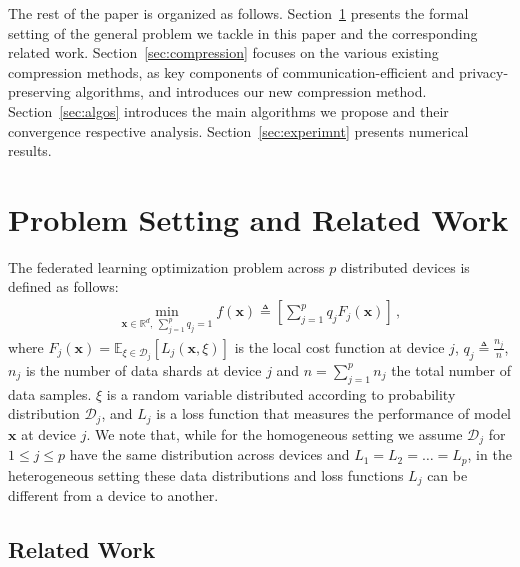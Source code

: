 \documentclass[twoside]{article}
\newcommand{\todo}[1]{\textcolor{red}{ToDo:~#1}}
\begin{document}
The rest of the paper is organized as follows.
Section~\ref{sec:related} presents the formal setting of the general problem we tackle in this paper and the corresponding related work.
Section~\ref{sec:compression} focuses on the various existing compression methods, as key components of communication-efficient and privacy-preserving  algorithms, and introduces our new compression method.
Section~\ref{sec:algos} introduces the main algorithms we propose and their convergence respective analysis.
Section~\ref{sec:experimnt} presents numerical results.

\vspace{-0.05in}
\section{Problem Setting and Related Work}\label{sec:related}
\vspace{-0.05in}


The federated learning optimization problem across $p$ distributed devices is defined as follows:
\begin{align}\label{eq:main}
   \min_{\boldsymbol{x}\in \mathbb{R}^{d},\: \sum_{j=1}^pq_j=1} f(\boldsymbol{x})\triangleq \left[\sum_{j=1}^{p}q_jF_j(\boldsymbol{x})\right] \, , 
\end{align}
where $F_j(\boldsymbol{x})=\mathbb{E}_{\xi\in\mathcal{D}_j}\left[L_j\left(\boldsymbol{x},\xi\right)\right]$ is the local cost function at device $j$, $q_j\triangleq\frac{n_j}{n}$, $n_j$ is the number of data shards at device $j$ and $n=\sum_{j=1}^pn_j$ the total number of data samples.
$\xi$ is a random variable distributed according to probability distribution $\mathcal{D}_j$, and $L_j$ is a loss function that measures the performance of model $\boldsymbol{x}$ at device $j$. 
We note that, while for the homogeneous setting we assume $\mathcal{D}_j$ for $1\leq j\leq p$ have the same distribution across devices and $L_1=L_2=\ldots=L_p$, in the heterogeneous setting these data distributions and loss functions $L_j$ can be different from a device to another. 


\vspace{-0.05in}
\subsection{Related Work}
\vspace{-0.05in}
\end{document}
